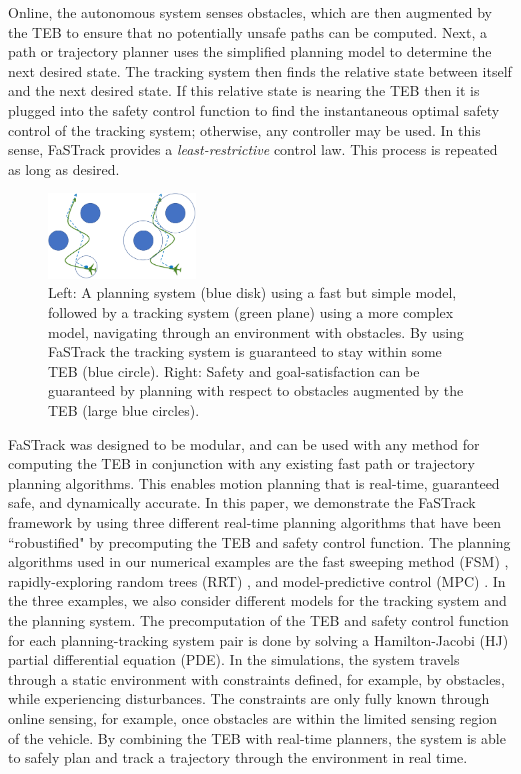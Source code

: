 Online, the autonomous system senses obstacles, which are then augmented by the TEB to ensure that no potentially unsafe paths can be computed. 
Next, a path or trajectory planner uses the simplified planning model to determine the next desired state. 
The tracking system then finds the relative state between itself and the next desired state. 
If this relative state is nearing the TEB then it is plugged into the safety control function to find the instantaneous optimal safety control of the tracking system; otherwise, any controller may be used. In this sense, FaSTrack provides a \emph{least-restrictive} control law. 
This process is repeated as long as desired. 
  
\begin{figure}
	\centering
	\includegraphics[width=0.35\textwidth]{fig/chasing}
	\caption{Left: A planning system (blue disk) using a fast but simple model, followed by a tracking system (green plane) using a more complex model, navigating through an environment with obstacles. By using FaSTrack the tracking system is guaranteed to stay within some TEB (blue circle). Right: Safety and goal-satisfaction can be guaranteed by planning with respect to obstacles augmented by the TEB (large blue circles).}
	\label{fig:chasing}
\end{figure}
%

FaSTrack was designed to be modular, and can be used with any method for computing the TEB in conjunction with any existing fast path or trajectory planning algorithms.  
This enables motion planning that is real-time, guaranteed safe, and dynamically accurate. 
In this paper, we demonstrate the FaSTrack framework by using three different real-time planning algorithms that have been ``robustified" by precomputing the TEB and safety control function. 
The planning algorithms used in our numerical examples are the fast sweeping method (FSM) \cite{Takei2013}, rapidly-exploring random trees (RRT) \cite{Kuffner2000,Kavraki1996}, and model-predictive control (MPC) \cite{Qin2003}. 
In the three examples, we also consider different models for the tracking system and the planning system.
The precomputation of the TEB and safety control function for each planning-tracking system pair is done by solving a Hamilton-Jacobi (HJ) partial differential equation (PDE). 
In the simulations, the system travels through a static environment with constraints defined, for example, by obstacles, while experiencing disturbances.
The constraints are only fully known through online sensing, for example, once obstacles are within the limited sensing region of the vehicle. 
By combining the TEB with real-time planners, the system is able to safely plan and track a trajectory through the environment in real time. 
